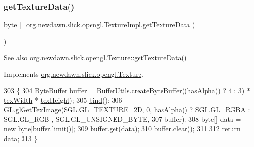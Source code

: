 \subsubsection{\texorpdfstring{get\+Texture\+Data()}{getTextureData()}}
{\footnotesize\ttfamily byte \mbox{[}$\,$\mbox{]} org.\+newdawn.\+slick.\+opengl.\+Texture\+Impl.\+get\+Texture\+Data (\begin{DoxyParamCaption}{ }\end{DoxyParamCaption})\hspace{0.3cm}{\ttfamily [inline]}}

\begin{DoxySeeAlso}{See also}
\mbox{\hyperlink{interfaceorg_1_1newdawn_1_1slick_1_1opengl_1_1_texture_a84c7714d8bdd0e4a933a95ae33531ad7}{org.\+newdawn.\+slick.\+opengl.\+Texture\+::get\+Texture\+Data()}} 
\end{DoxySeeAlso}


Implements \mbox{\hyperlink{interfaceorg_1_1newdawn_1_1slick_1_1opengl_1_1_texture_a84c7714d8bdd0e4a933a95ae33531ad7}{org.\+newdawn.\+slick.\+opengl.\+Texture}}.


\begin{DoxyCode}
303                                    \{
304         ByteBuffer buffer = BufferUtils.createByteBuffer((\mbox{\hyperlink{classorg_1_1newdawn_1_1slick_1_1opengl_1_1_texture_impl_ae07673bff3b44a0f681a8ec9a9a5fadf}{hasAlpha}}() ? 4 : 3) * 
      \mbox{\hyperlink{classorg_1_1newdawn_1_1slick_1_1opengl_1_1_texture_impl_acb22083c60049df21f8e484413d73212}{texWidth}} * \mbox{\hyperlink{classorg_1_1newdawn_1_1slick_1_1opengl_1_1_texture_impl_afa18dcc63658ee42ca8f6a2822f18c1d}{texHeight}});
305         \mbox{\hyperlink{classorg_1_1newdawn_1_1slick_1_1opengl_1_1_texture_impl_a181498048d34fa8da8a86613d524f68e}{bind}}();
306         \mbox{\hyperlink{classorg_1_1newdawn_1_1slick_1_1opengl_1_1_texture_impl_ad672b5a41ba59c882980c429c09b6572}{GL}}.\mbox{\hyperlink{interfaceorg_1_1newdawn_1_1slick_1_1opengl_1_1renderer_1_1_s_g_l_a2df0054d4c79f4f9d854a7b55975ecc0}{glGetTexImage}}(SGL.GL\_TEXTURE\_2D, 0, \mbox{\hyperlink{classorg_1_1newdawn_1_1slick_1_1opengl_1_1_texture_impl_ae07673bff3b44a0f681a8ec9a9a5fadf}{hasAlpha}}() ? SGL.GL\_RGBA : SGL.GL\_RGB
      , SGL.GL\_UNSIGNED\_BYTE, 
307                            buffer);
308         byte[] data = \textcolor{keyword}{new} byte[buffer.limit()];
309         buffer.get(data);
310         buffer.clear();
311         
312         \textcolor{keywordflow}{return} data;
313     \}
\end{DoxyCode}
\mbox{\label{classorg_1_1newdawn_1_1slick_1_1opengl_1_1_texture_impl_ad3ab4017a31fb25922ee51990acb2231}} 
